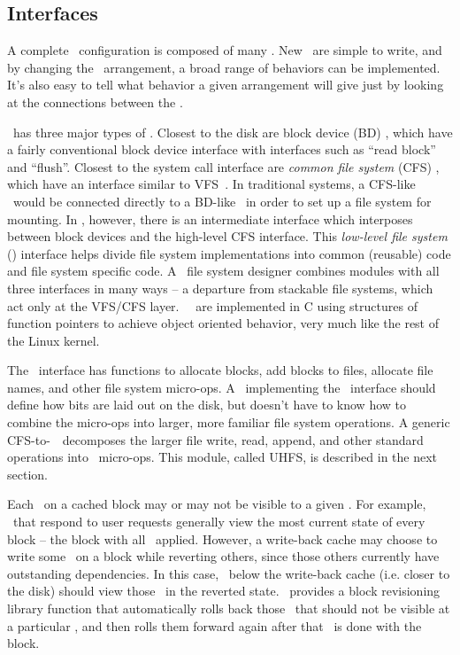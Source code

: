 \subsection {Interfaces}
\label{sec:modules:interfaces}

A complete \Kudos\ configuration is composed of many \modules. New \modules\ are
simple to write, and by changing the \module\ arrangement, a broad range of
behaviors can be implemented. It's also easy to tell what behavior a given
arrangement will give just by looking at the connections between the \modules.

\Kudos\ has three major types of \modules.
%
Closest to the disk are block device (BD) \modules, which have a fairly
conventional block device interface with interfaces such as ``read block'' and
``flush''. 
%
Closest to the system call interface are \emph{common file system} (CFS)
\modules, which have an interface similar to VFS~\cite{kleiman86vnodes}. 
%
In traditional systems, a CFS-like \module\ would be connected directly to a
BD-like \module\ in order to set up a file system for mounting. In \Kudos,
however, there is an intermediate interface which interposes between block
devices and the high-level CFS interface.
%
This \emph{low-level file system} (\LFS) interface helps divide file system
implementations into common (reusable) code and file system specific code. A
\Kudos\ file system designer combines modules with all three interfaces in many
ways -- a departure from stackable file systems, which act only at the VFS/CFS
layer. \Kudos\ \modules\ are implemented in C using structures of function
pointers to achieve object oriented behavior, very much like the rest of the
Linux kernel.

The \LFS\ interface has functions to allocate blocks, add blocks to files,
allocate file names, and other file system micro-ops. A \module\ implementing
the \LFS\ interface should define how bits are laid out on the disk, but doesn't
have to know how to combine the micro-ops into larger, more familiar file system
operations. A generic CFS-to-\LFS\ \module\ decomposes the larger file write,
read, append, and other standard operations into \LFS\ micro-ops. This module,
called UHFS, is described in the next section.

Each \chdesc\ on a cached block may or may not be visible to a given \module.
For example, \modules\ that respond to user requests generally view the most
current state of every block -- the block with all \chdescs\ applied. However, a
write-back cache may choose to write some \chdescs\ on a block while reverting
others, since those others currently have outstanding dependencies. In this
case, \modules\ below the write-back cache (i.e. closer to the disk) should view
those \chdescs\ in the reverted state. \Kudos\ provides a block revisioning
library function that automatically rolls back those \chdescs\ that should not
be visible at a particular \module, and then rolls them forward again after that
\module\ is done with the block.
